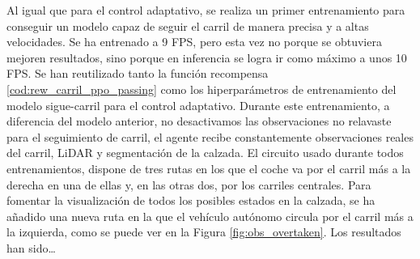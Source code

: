 Al igual que para el control adaptativo, se realiza un primer entrenamiento para conseguir un modelo capaz de seguir el carril de manera precisa y a altas velocidades. Se ha entrenado a 9 \ac{FPS}, pero esta vez no porque se obtuviera mejoren resultados, sino porque en inferencia se logra ir como máximo a unos 10 \ac{FPS}. Se han reutilizado tanto la función recompensa \ref{cod:rew_carril_ppo_passing} como los hiperparámetros de entrenamiento del modelo sigue-carril para el control adaptativo. Durante este entrenamiento, a diferencia del modelo anterior, no desactivamos las observaciones no relavaste para el seguimiento de carril, el agente recibe constantemente observaciones reales del carril, \ac{LiDAR} y segmentación de la calzada. El circuito usado durante todos entrenamientos, dispone de tres rutas en los que el coche va por el carril más a la derecha en una de ellas y, en las otras dos, por los carriles centrales. Para fomentar la visualización de todos los posibles estados en la calzada, se ha añadido una nueva ruta en la que el vehículo autónomo circula por el carril más a la izquierda, como se puede ver en la Figura \ref{fig:obs_overtaken}. Los resultados han sido…
